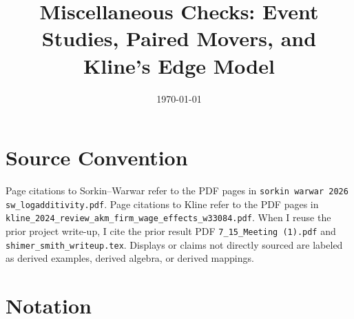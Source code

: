 \documentclass[11pt]{article}
\title{Miscellaneous Checks: Event Studies, Paired Movers, and Kline's Edge Model}
\author{}
\date{\today}
\begin{document}
\maketitle

\section*{Source Convention}

Page citations to Sorkin--Warwar refer to the PDF pages in
\texttt{sorkin warwar 2026 sw\_logadditivity.pdf}. Page citations to Kline refer
to the PDF pages in \texttt{kline\_2024\_review\_akm\_firm\_wage\_effects\_w33084.pdf}.
When I reuse the prior project write-up, I cite the prior result PDF
\texttt{7\_15\_Meeting (1).pdf} and \texttt{shimer\_smith\_writeup.tex}.
Displays or claims not directly sourced are labeled as derived examples,
derived algebra, or derived mappings.

\section{Notation}
\end{document}
